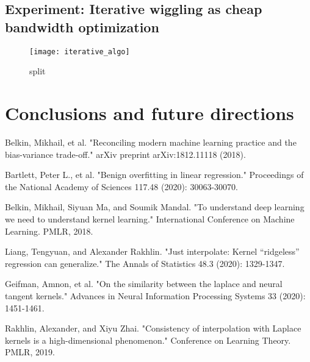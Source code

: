 \documentclass[12pt]{amsart}
\begin{document}
\subsection{Experiment: Iterative wiggling as cheap bandwidth optimization}

\begin{figure}[htp]
    \centering
    \texttt{[image: iterative\_algo]}
    \caption{split}
    \label{fig:iterative_algo}
\end{figure}

\section{Conclusions and future directions}



\begin{thebibliography}{20}

Belkin, Mikhail, et al. "Reconciling modern machine learning practice and the bias-variance trade-off." arXiv preprint arXiv:1812.11118 (2018).

Bartlett, Peter L., et al. "Benign overfitting in linear regression." Proceedings of the National Academy of Sciences 117.48 (2020): 30063-30070.

Belkin, Mikhail, Siyuan Ma, and Soumik Mandal. "To understand deep learning we need to understand kernel learning." International Conference on Machine Learning. PMLR, 2018.

Liang, Tengyuan, and Alexander Rakhlin. "Just interpolate: Kernel “ridgeless” regression can generalize." The Annals of Statistics 48.3 (2020): 1329-1347.

Geifman, Amnon, et al. "On the similarity between the laplace and neural tangent kernels." Advances in Neural Information Processing Systems 33 (2020): 1451-1461.

Rakhlin, Alexander, and Xiyu Zhai. "Consistency of interpolation with Laplace kernels is a high-dimensional phenomenon." Conference on Learning Theory. PMLR, 2019.

\end{thebibliography}
\end{document}
